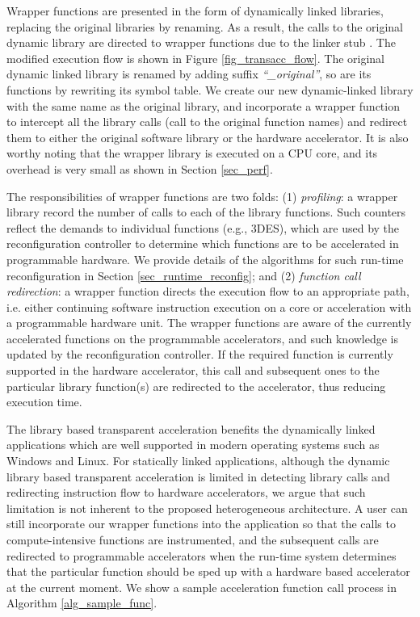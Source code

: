 Wrapper functions are presented in the form of dynamically linked
libraries, replacing the original libraries by renaming. As a result,
the calls to the original dynamic library are directed to wrapper
functions due to the linker stub \cite{linkerstub}. The modified
execution flow is shown in Figure \ref{fig_transacc_flow}.  The
original dynamic linked library is renamed by adding suffix
{\em ``\_original''}, so are its functions by rewriting its symbol table. We
create our new dynamic-linked library with the same name as the original library, and
incorporate a wrapper function to intercept all the library calls
(call to the original function names) and
redirect them to either the original software library or the hardware
accelerator. It is also worthy noting that the wrapper library is
executed on a CPU core, and its overhead is very small as shown in
Section \ref{sec_perf}.

The responsibilities of wrapper functions are two folds: (1) {\em profiling}:
a wrapper library record the number of calls to each of the
library functions. Such counters reflect the demands to individual
functions (e.g., 3DES), which are used by the reconfiguration
controller to determine which functions are to be accelerated in
programmable hardware. We provide details of the algorithms for such
run-time reconfiguration in Section \ref{sec_runtime_reconfig}; and (2)
{\em function call redirection}: a wrapper function directs the
execution flow to an appropriate path, i.e. either continuing software instruction execution on a core or
acceleration with a programmable hardware unit. The wrapper functions
are aware of the currently accelerated functions on the programmable
accelerators, and such knowledge is updated by the reconfiguration
controller. If the required function is currently supported in the hardware
accelerator, this call and subsequent ones to the particular library
function(s) are redirected to the accelerator, thus reducing execution
time.

The library based transparent acceleration benefits the dynamically
linked applications which are well supported in modern operating
systems such as Windows and Linux. For statically linked applications,
although the dynamic library based transparent acceleration is limited
in detecting library calls and redirecting instruction flow to
hardware accelerators, we argue that such limitation is not inherent
to the proposed heterogeneous architecture. A user can still
incorporate our wrapper functions into the application so that the
calls to compute-intensive functions are instrumented, and the
subsequent calls are redirected to programmable accelerators when the
run-time system determines that the particular function should be sped
up with a hardware based accelerator at the current moment.
We show a sample acceleration function call process in Algorithm \ref{alg_sample_func}.

